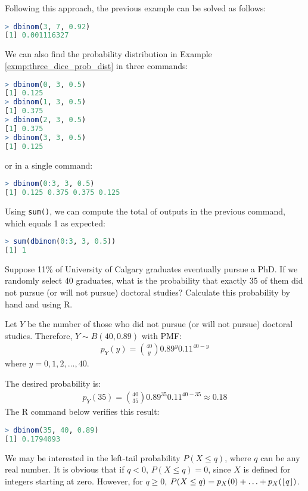 Following this approach, the previous example can be solved as follows:
\begin{lstlisting}[language=R]
> dbinom(3, 7, 0.92)
[1] 0.001116327
\end{lstlisting}
We can also find the probability distribution in Example \autoref{exmp:three_dice_prob_dist} in three commands:
\begin{lstlisting}[language=R]
> dbinom(0, 3, 0.5)
[1] 0.125
> dbinom(1, 3, 0.5)
[1] 0.375
> dbinom(2, 3, 0.5)
[1] 0.375
> dbinom(3, 3, 0.5)
[1] 0.125
\end{lstlisting}
or in a single command:
\begin{lstlisting}[language=R]
> dbinom(0:3, 3, 0.5)
[1] 0.125 0.375 0.375 0.125
\end{lstlisting}
Using \verb|sum()|, we can compute the total of outputs in the previous command, which equals 1 as expected:
\begin{lstlisting}[language=R]
> sum(dbinom(0:3, 3, 0.5))
[1] 1
\end{lstlisting}
\begin{exmp}\label{exmp:ucalgary}
    Suppose 11\% of University of Calgary graduates eventually pursue a PhD.
    If we randomly select 40 graduates,
    what is the probability that exactly 35 of them did not pursue (or will not pursue) doctoral studies?
    Calculate this probability by hand and using R.
\end{exmp}
\begin{solution}
    Let \( Y \) be the number of those who did not pursue (or will not pursue) doctoral studies.
    Therefore, \( Y \sim B(40, 0.89) \) with PMF:
    \begin{gather*}
        p_{Y}(y) = \binom{40}{y} 0.89^{y}0.11^{40 - y}
    \end{gather*}
    where \( y = 0, 1, 2, \ldots, 40 \).

    The desired probability is:
    \begin{gather*}
        p_{Y}(35) = \binom{40}{35} 0.89^{35}0.11^{40 - 35} \approx 0.18
    \end{gather*}
    The R command below verifies this result:
    \begin{lstlisting}[language=R]
> dbinom(35, 40, 0.89)
[1] 0.1794093
    \end{lstlisting}
\end{solution}
We may be interested in the left-tail probability \( P(X \leq q) \), where \( q \) can be any real number.
It is obvious that if \( q < 0 \), \( P(X \leq q) = 0 \), since \( X \) is defined for integers starting at zero.
However, for \( q \geq 0\), \( P(X \leq q) = p_{X}(0) + \ldots + p_{X}(\lfloor q\rfloor) \).

